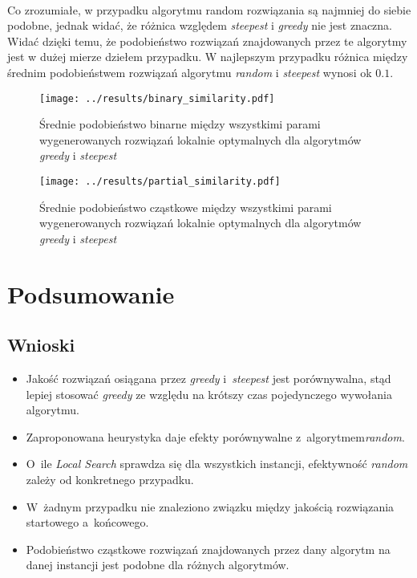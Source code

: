 \documentclass{article}
\begin{document}
	\\Co zrozumiałe, w przypadku algorytmu random rozwiązania są najmniej do siebie podobne, jednak widać, że różnica względem \emph{steepest} i \emph{greedy} nie jest znaczna. Widać dzięki temu, że podobieństwo rozwiązań znajdowanych przez te algorytmy jest w dużej mierze dziełem przypadku. W najlepszym przypadku różnica między średnim podobieństwem rozwiązań algorytmu \emph{random} i \emph{steepest} wynosi ok $0.1$.
			\begin{figure}[h]
				\texttt{[image: ../results/binary\_similarity.pdf]}
				\caption{Średnie podobieństwo binarne między wszystkimi parami wygenerowanych rozwiązań lokalnie optymalnych dla algorytmów \emph{greedy} i \emph{steepest}\label{fig:bin_sim}}		
			\end{figure}				
			\begin{figure}[h]
				\texttt{[image: ../results/partial\_similarity.pdf]}
				\caption{Średnie podobieństwo cząstkowe między wszystkimi parami wygenerowanych rozwiązań lokalnie optymalnych dla algorytmów \emph{greedy} i \emph{steepest}\label{fig:part_sim}}		
			\end{figure}	
		
\section{Podsumowanie}
	\subsection{Wnioski}
		\begin{itemize}
			\item Jakość rozwiązań osiągana przez \emph{greedy} i~\emph{steepest} jest porównywalna, stąd lepiej stosować \emph{greedy} ze względu na krótszy czas pojedynczego wywołania algorytmu.
			\item Zaproponowana heurystyka daje efekty porównywalne z~algorytmem\emph{random}.
			\item O~ile \emph{Local Search} sprawdza się dla wszystkich instancji, efektywność 	\emph{random} zależy od konkretnego przypadku.
			\item W~żadnym przypadku nie znaleziono związku między jakością rozwiązania startowego a~końcowego.
			\item Podobieństwo cząstkowe rozwiązań znajdowanych przez dany algorytm na danej instancji jest podobne dla różnych algorytmów.
		\end{itemize}





\end{document}
